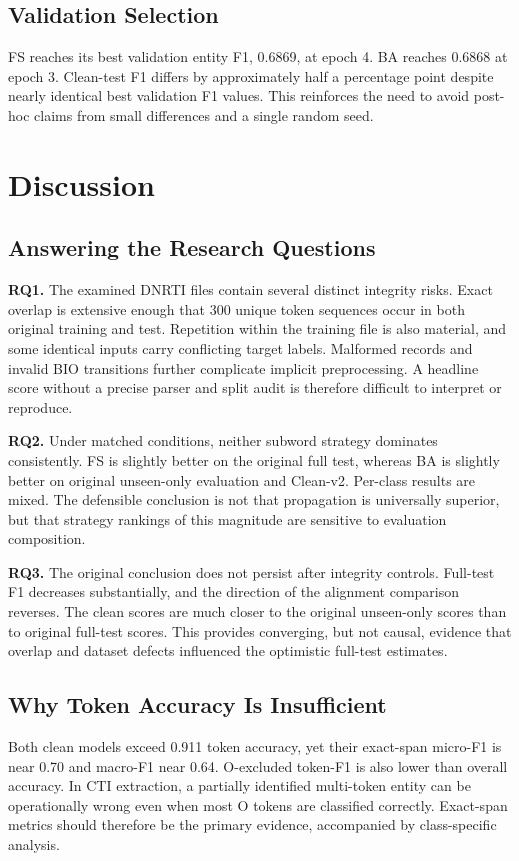 \documentclass[conference]{IEEEtran}
\begin{document}
\subsection{Validation Selection}
FS reaches its best validation entity F1, 0.6869, at epoch 4. BA reaches 0.6868 at epoch 3. Clean-test F1 differs by approximately half a percentage point despite nearly identical best validation F1 values. This reinforces the need to avoid post-hoc claims from small differences and a single random seed.

\section{Discussion}
\subsection{Answering the Research Questions}
\textbf{RQ1.} The examined DNRTI files contain several distinct integrity risks. Exact overlap is extensive enough that 300 unique token sequences occur in both original training and test. Repetition within the training file is also material, and some identical inputs carry conflicting target labels. Malformed records and invalid BIO transitions further complicate implicit preprocessing. A headline score without a precise parser and split audit is therefore difficult to interpret or reproduce.

\textbf{RQ2.} Under matched conditions, neither subword strategy dominates consistently. FS is slightly better on the original full test, whereas BA is slightly better on original unseen-only evaluation and Clean-v2. Per-class results are mixed. The defensible conclusion is not that propagation is universally superior, but that strategy rankings of this magnitude are sensitive to evaluation composition.

\textbf{RQ3.} The original conclusion does not persist after integrity controls. Full-test F1 decreases substantially, and the direction of the alignment comparison reverses. The clean scores are much closer to the original unseen-only scores than to original full-test scores. This provides converging, but not causal, evidence that overlap and dataset defects influenced the optimistic full-test estimates.

\subsection{Why Token Accuracy Is Insufficient}
Both clean models exceed 0.911 token accuracy, yet their exact-span micro-F1 is near 0.70 and macro-F1 near 0.64. O-excluded token-F1 is also lower than overall accuracy. In CTI extraction, a partially identified multi-token entity can be operationally wrong even when most O tokens are classified correctly. Exact-span metrics should therefore be the primary evidence, accompanied by class-specific analysis.
\end{document}
